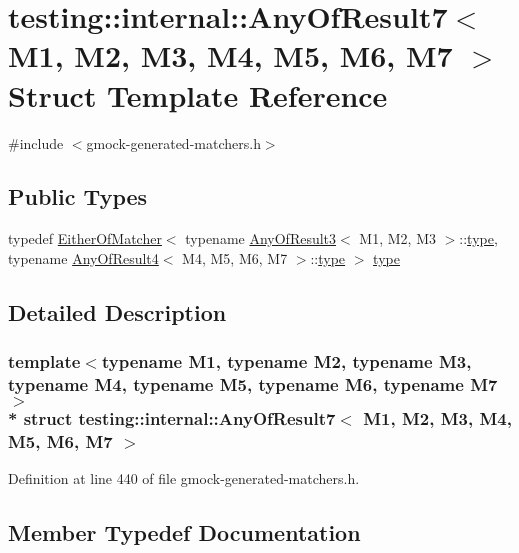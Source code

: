 \hypertarget{structtesting_1_1internal_1_1_any_of_result7}{}\section{testing\+:\+:internal\+:\+:Any\+Of\+Result7$<$ M1, M2, M3, M4, M5, M6, M7 $>$ Struct Template Reference}
\label{structtesting_1_1internal_1_1_any_of_result7}


{\ttfamily \#include $<$gmock-\/generated-\/matchers.\+h$>$}

\subsection*{Public Types}
\begin{DoxyCompactItemize}
\item 
typedef \hyperlink{classtesting_1_1internal_1_1_either_of_matcher}{Either\+Of\+Matcher}$<$ typename \hyperlink{structtesting_1_1internal_1_1_any_of_result3}{Any\+Of\+Result3}$<$ M1, M2, M3 $>$\+::\hyperlink{structtesting_1_1internal_1_1_any_of_result7_a976873478921520833464a86f840abe8}{type}, typename \hyperlink{structtesting_1_1internal_1_1_any_of_result4}{Any\+Of\+Result4}$<$ M4, M5, M6, M7 $>$\+::\hyperlink{structtesting_1_1internal_1_1_any_of_result7_a976873478921520833464a86f840abe8}{type} $>$ \hyperlink{structtesting_1_1internal_1_1_any_of_result7_a976873478921520833464a86f840abe8}{type}
\end{DoxyCompactItemize}


\subsection{Detailed Description}
\subsubsection*{template$<$typename M1, typename M2, typename M3, typename M4, typename M5, typename M6, typename M7$>$\\*
struct testing\+::internal\+::\+Any\+Of\+Result7$<$ M1, M2, M3, M4, M5, M6, M7 $>$}



Definition at line 440 of file gmock-\/generated-\/matchers.\+h.



\subsection{Member Typedef Documentation}
